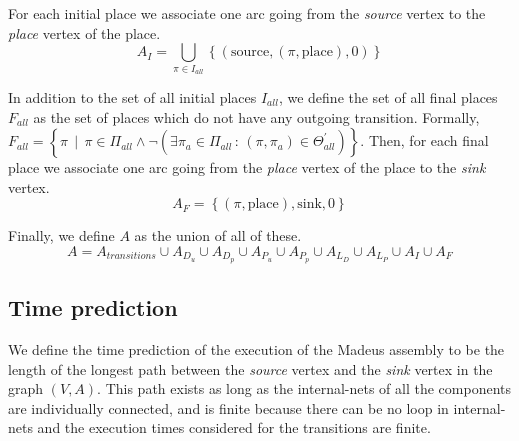 For each initial place we associate one arc going from the \emph{source}
vertex to the \emph{place} vertex of the place. 
\[
A_{I}=\bigcup_{\pi\in I_{all}}\left\{ \left(\text{source},\left(\pi,\text{place}\right),0\right)\right\} 
\]

In addition to the set of all initial places $I_{all}$, we define
the set of all final places $F_{all}$ as the set of places which
do not have any outgoing transition. Formally, $F_{all}=\left\{ \pi\,\mid\,\pi\in\Pi_{all}\land\lnot\left(\exists\pi_{a}\in\Pi_{all}\,:\,\left(\pi,\pi_{a}\right)\in\Theta_{all}^{\prime}\right)\right\} $.
Then, for each final place we associate one arc going from the \emph{place}
vertex of the place to the \emph{sink} vertex. 
\[
A_{F}=\left\{ \left(\pi,\text{place}\right),\text{sink},0\right\} 
\]

Finally, we define $A$ as the union of all of these. 
\[
A=A_{transitions}\cup A_{D_{u}}\cup A_{D_{p}}\cup A_{P_{u}}\cup A_{P_{p}}\cup A_{L_{D}}\cup A_{L_{P}}\cup A_{I}\cup A_{F}
\]


\subsection{Time prediction}

We define the time prediction of the execution of the Madeus assembly
to be the length of the longest path between the \emph{source} vertex
and the \emph{sink} vertex in the graph $\left(V,A\right)$. This
path exists as long as the internal-nets of all the components are
individually connected, and is finite because there can be no loop
in internal-nets and the execution times considered for the transitions
are finite.
